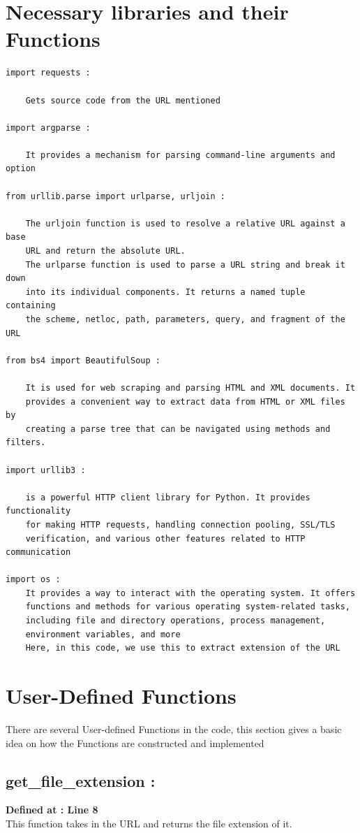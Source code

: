 \documentclass{article}
\begin{document}
\section{Necessary libraries and their Functions}
\begin{verbatim}
import requests :

    Gets source code from the URL mentioned
    
import argparse : 

    It provides a mechanism for parsing command-line arguments and option

from urllib.parse import urlparse, urljoin : 

    The urljoin function is used to resolve a relative URL against a base
    URL and return the absolute URL.
    The urlparse function is used to parse a URL string and break it down 
    into its individual components. It returns a named tuple containing 
    the scheme, netloc, path, parameters, query, and fragment of the URL

from bs4 import BeautifulSoup : 

    It is used for web scraping and parsing HTML and XML documents. It 
    provides a convenient way to extract data from HTML or XML files by 
    creating a parse tree that can be navigated using methods and filters.

import urllib3 : 
    
    is a powerful HTTP client library for Python. It provides functionality
    for making HTTP requests, handling connection pooling, SSL/TLS 
    verification, and various other features related to HTTP communication

import os : 
    It provides a way to interact with the operating system. It offers 
    functions and methods for various operating system-related tasks, 
    including file and directory operations, process management, 
    environment variables, and more
    Here, in this code, we use this to extract extension of the URL
\end{verbatim}
\newpage
\section{User-Defined Functions}
    There are several User-defined Functions in the code, this section gives a basic idea on how the Functions are constructed and implemented

\subsection{get\_file\_extension :}
    \textbf{Defined at : Line 8}\\[0.4cm]
    This function takes in the URL and returns the file extension of it.
\end{document}
